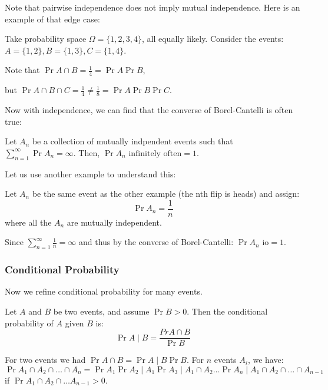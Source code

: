 Note that pairwise independence does not imply mutual independence. Here is
an example of that edge case:

\begin{example}
    Take probability space $\Omega = \{1, 2, 3, 4\}$, all equally likely. Consider the events:
    $A = \{1, 2\}, B = \{1, 3\}, C=\{1,4\}$.

    Note that $\Pr{A \cap B} = \frac{1}{4} = \Pr{A} \Pr{B}$, 
    
    but
    $\Pr{A \cap B \cap C} = \frac{1}{4} \neq \frac{1}{8} = \Pr{A} \Pr{B} \Pr{C}$.
\end{example}

Now with independence, we can find that the converse of Borel-Cantelli is often true:

\begin{theorem} 
    Let $A_n$ be a collection of mutually indpendent events such that
    $\sum_{n = 1}^{\infty} \Pr{A_n} = \infty$. Then, $\Pr{A_n \text{ infinitely often}} = 1$.
\end{theorem}

Let us use another example to understand this:

\begin{example}
    Let $A_n$ be the same event as the other example (the nth flip is heads) and assign:
    \[ \Pr{A_n} = \frac{1}{n} \]
    where all the $A_n$ are mutually independent.

    Since $\sum_{n = 1}^{\infty} \frac{1}{n} = \infty$ and thus by the converse of Borel-Cantelli:
    $\Pr{A_n \text{ io}} = 1$.
\end{example}

\subsubsection{Conditional Probability}
Now we refine conditional probability for many events.

\begin{definition} 
    Let $A$ and $B$ be two events, and assume $\Pr{B} > 0$. Then the conditional probability of $A$ given $B$ is:
    \[ \Pr{A \mid B} = \frac{Pr{A \cap B}}{\Pr{B}} \]
\end{definition}

\begin{theorem} 
    For two events we had $\Pr{A \cap B} = \Pr{A \mid B} \Pr{B}$. For $n$ events
    $A_i$, we have:
    \[ \Pr{A_1 \cap A_2 \cap \dots \cap A_n} = \Pr{A_1} \Pr{A_2 \mid A_1} \Pr{A_3 \mid A_1 \cap A_2} \dots \Pr{A_n \mid A_1 \cap A_2 \cap \dots \cap A_{n -1}} \]
    if $\Pr{A_1 \cap A_2 \cap \dots A_{n - 1}} > 0$.
\end{theorem}

